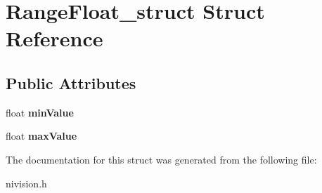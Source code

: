 \hypertarget{structRangeFloat__struct}{
\section{RangeFloat\_\-struct Struct Reference}
\label{structRangeFloat__struct}
}
\subsection*{Public Attributes}
\begin{DoxyCompactItemize}
\item 
\hypertarget{structRangeFloat__struct_a524422b325edfecdbbec688b444569c8}{
float {\bfseries minValue}}
\label{structRangeFloat__struct_a524422b325edfecdbbec688b444569c8}

\item 
\hypertarget{structRangeFloat__struct_ad37829ad479fcb8a83a0ac3505d88896}{
float {\bfseries maxValue}}
\label{structRangeFloat__struct_ad37829ad479fcb8a83a0ac3505d88896}

\end{DoxyCompactItemize}


The documentation for this struct was generated from the following file:\begin{DoxyCompactItemize}
\item 
nivision.h\end{DoxyCompactItemize}
